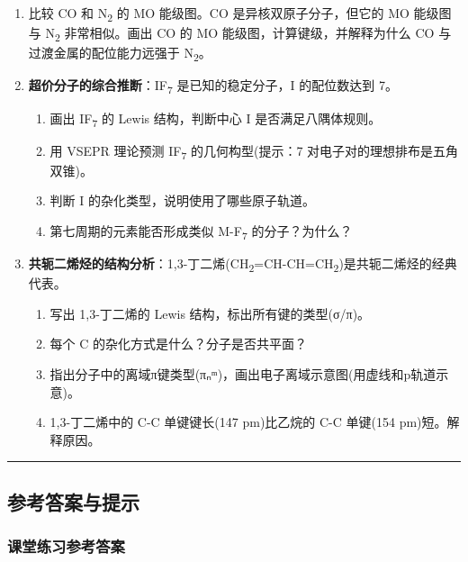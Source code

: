 \begin{enumerate}
\def\labelenumi{\arabic{enumi}.}
\setcounter{enumi}{8}
\item
  比较 CO 和 N\textsubscript{2} 的 MO 能级图。CO 是异核双原子分子，但它的 MO 能级图与 N\textsubscript{2} 非常相似。画出 CO 的 MO 能级图，计算键级，并解释为什么 CO 与过渡金属的配位能力远强于 N\textsubscript{2}。
\item
  \textbf{超价分子的综合推断}：IF\textsubscript{7} 是已知的稳定分子，I 的配位数达到 7。

  \begin{enumerate}
  \def\labelenumii{(\arabic{enumii})}
  \tightlist
  \item
    画出 IF\textsubscript{7} 的 Lewis 结构，判断中心 I 是否满足八隅体规则。
  \item
    用 VSEPR 理论预测 IF\textsubscript{7} 的几何构型(提示：7 对电子对的理想排布是五角双锥)。
  \item
    判断 I 的杂化类型，说明使用了哪些原子轨道。
  \item
    第七周期的元素能否形成类似 M-F\textsubscript{7} 的分子？为什么？
  \end{enumerate}
\item
  \textbf{共轭二烯烃的结构分析}：1,3-丁二烯(CH\textsubscript{2}=CH-CH=CH\textsubscript{2})是共轭二烯烃的经典代表。

  \begin{enumerate}
  \def\labelenumii{(\arabic{enumii})}
  \tightlist
  \item
    写出 1,3-丁二烯的 Lewis 结构，标出所有键的类型(σ/π)。
  \item
    每个 C 的杂化方式是什么？分子是否共平面？
  \item
    指出分子中的离域π键类型(πₙᵐ)，画出电子离域示意图(用虚线和p轨道示意)。
  \item
    1,3-丁二烯中的 C-C 单键键长(147 pm)比乙烷的 C-C 单键(154 pm)短。解释原因。
  \end{enumerate}
\end{enumerate}

\begin{center}\rule{0.5\linewidth}{0.5pt}\end{center}

\subsection{参考答案与提示}\label{ux53c2ux8003ux7b54ux6848ux4e0eux63d0ux793a}

\subsubsection{课堂练习参考答案}\label{ux8bfeux5802ux7ec3ux4e60ux53c2ux8003ux7b54ux6848}

